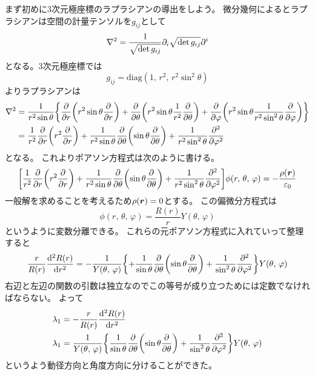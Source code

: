 \documentclass[../../master.tex]{subfiles}
\begin{document}
まず初めに3次元極座標のラプラシアンの導出をしよう。
微分幾何によるとラプラシアンは空間の計量テンソルを\(g_{ij}\)として
\begin{equation}
	\laplacian = \frac{1}{\sqrt{\det g_{ij}}}\partial_i \sqrt{\det g_{ij}}\partial^i
\end{equation}
となる。3次元極座標では
\begin{equation}
	g_{ij} = \text{diag}(1,\,r^2,\,r^2\sin^2\theta)
\end{equation}
よりラプラシアンは
\begin{align}
	\laplacian & = \frac{1}{r^2\sin\theta}\qty{
		\pdv{r}\qty(r^2\sin\theta\pdv{r})
		+\pdv{\theta}\qty(r^2\sin\theta \frac{1}{r^2}\pdv{\theta})
		+\pdv{\varphi}\qty(r^2\sin\theta \frac{1}{r^2\sin^2\theta}\pdv{\varphi})
	}                                                   \\
	           & = \frac{1}{r^2}\pdv{r}\qty(r^2\pdv{r})
	+ \frac{1}{r^2\sin\theta}\pdv{\theta}\qty(\sin\theta\pdv{\theta})
	+ \frac{1}{r^2\sin^2\theta}\pdv[2]{\varphi}
\end{align}
となる。
これよりポアソン方程式は次のように書ける。
\begin{equation}
	\qty[\frac{1}{r^2}\pdv{r}\qty(r^2\pdv{r})
		+ \frac{1}{r^2\sin\theta}\pdv{\theta}\qty(\sin\theta\pdv{\theta})
		+ \frac{1}{r^2\sin^2\theta}\pdv[2]{\varphi}] \phi(r,\,\theta,\,\varphi)
	= -\frac{\rho(\vb*{r})}{\varepsilon_0}
\end{equation}
一般解を求めることを考えるため\(\rho(\vb*{r})=0\)とする。
この偏微分方程式は
\begin{equation}
	\phi(r,\,\theta,\,\varphi) = \frac{R(r)}{r}Y(\theta,\,\varphi)
\end{equation}
というように変数分離できる。
これらの元ポアソン方程式に入れていって整理すると
\begin{equation}
	\frac{r}{R(r)}\dv[2]{R(r)}{r}
	= -\frac{1}{Y(\theta,\,\varphi)}\qty{
		+\frac{1}{\sin\theta}\pdv{\theta}
		\qty(\sin\theta\pdv{\theta})
		+ \frac{1}{\sin^2\theta}\pdv[2]{\varphi}}Y(\theta,\,\varphi)
\end{equation}
右辺と左辺の関数の引数は独立なのでこの等号が成り立つためには定数でなければならない。
よって
\begin{align}
	\lambda_1 & =-\frac{r}{R(r)}\dv[2]{R(r)}{r} \\
	\lambda_1 & = \frac{1}{Y(\theta,\,\varphi)}
	\qty{
		\frac{1}{\sin\theta}\pdv{\theta}
		\qty(\sin\theta\pdv{\theta})
		+ \frac{1}{\sin^2\theta}\pdv[2]{\varphi}}Y(\theta,\,\varphi)
\end{align}
というよう動径方向と角度方向に分けることができた。
\end{document}
